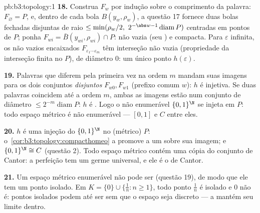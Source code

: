 \begin{solution}{pb:b3:topology:1}
\textbf{18.} Construa $F_w$ por indução sobre o comprimento da palavra:
$F_\varnothing = P$, e, dentro de cada bola $B(y_w, \rho_w)$,
a questão 17 fornece duas bolas fechadas disjuntas de raio $\leq
\min(\rho_w/2,\ 2^{-\abs w-1}\operatorname{diam}P)$ centradas
em pontos de $P$; ponha $F_{wi} = \bar B(y_{wi}, \rho_{wi})
\cap P$: não vazia (seu ) e compacta. Para $\varepsilon$ infinita, os  não vazios encaixados
$F_{\varepsilon_1\cdots\varepsilon_m}$ têm interseção não vazia
(propriedade da interseção finita no 
$P$), de diâmetro $0$: um único ponto $h(\varepsilon)$.

\textbf{19.} Palavras que diferem pela primeira vez na ordem $m$ mandam suas
imagens para os dois conjuntos \emph{disjuntos} $F_{w0}, F_{w1}$
(prefixo comum $w$): $h$ é injetiva. Se duas palavras coincidem até a
ordem $m$, ambas as imagens estão num conjunto de diâmetro $\leq
2^{-m}\operatorname{diam}P$: $h$ é . Logo o não enumerável
$\{0,1\}^\N$ se injeta em $P$: todo espaço métrico
  é não enumerável --- $[0,1]$ e $C$
entre eles.

\textbf{20.} $h$ é uma injeção  do 
$\{0,1\}^\N$ no  (métrico) $P$:
o~\cref{cor:b3:topology:compacthomeo} a promove a um
 sobre sua imagem; e $\{0,1\}^\N \cong C$
(questão 2). Todo espaço métrico   contém uma
cópia do conjunto de Cantor: a perfeição tem um germe universal, e
ele é o de Cantor.

\textbf{21.} Um espaço métrico  enumerável não pode ser
 (questão 19), de modo que ele tem um ponto isolado. Em $K =
\{0\}\cup\{\frac1n : n \geq 1\}$, todo ponto $\frac1n$ é
isolado e $0$ não é: pontos isolados podem até ser 
sem que o espaço seja discreto --- a  mantém seu
limite dentro.


\end{solution}
